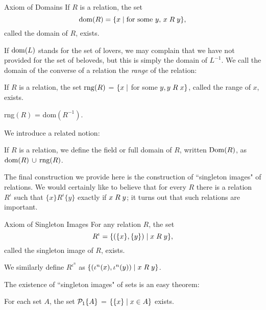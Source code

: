 \begin{axiom}{Axiom of Domains}
 If $R$ is a relation, the set
 $$
  \mathop{\mathrm{dom}}(R) = \{x \mid \mbox{for some $y$, $x \mathrel{R} y$}\},
 $$
 called the {\upshape domain} of $R$, exists.
\end{axiom}

If $\mathop{\mathrm{dom}}(L)$ stands for the set of lovers, we may complain that
we have not provided for the set of beloveds, but this is simply the
domain of $L^{-1}$.  We call the domain of the converse of a relation the {\itshape range} of the relation:

\begin{thm}
 If $R$ is a relation, the set $\mathop{\mathrm{rng}}(R)$ = 
 $\{x \mid$ for some $y, y \mathrel{R} x\}$, called the {\upshape range} of $x$,
 exists.
\end{thm}

\preuve  rng$(R)$ = dom$(R^{-1})$.
\finpreuve

We introduce a related notion:

\begin{definition}
 If $R$ is a relation, we define the {\upshape field}
 or {\upshape full domain} of $R$, written
 $\mathop{\mathrm{Dom}}(R)$, as $\mathop{\mathrm{dom}}(R)\,\cup\, \mathop{\mathrm{rng}}(R)$.
\end{definition}

The final construction we provide here is the construction of
``singleton images" of relations.  We would certainly like to believe
that for every $R$ there is a relation $R^{\iota}$ such that $\{x\}
\mathrel{R^{\iota}} \{y\}$ exactly if $x \mathrel{R} y$; it turns out that
such relations are important.

\begin{axiom}{Axiom of Singleton Images}
 For any relation $R$, the set 
 $$
  R^{\iota} =
  \{(\{x\},\{y\}) \mid x \mathrel{R} y\},
 $$
 called the {\upshape singleton image\/} of $R$, exists.
\end{axiom}

\begin{definition}
We similarly define $R^{\iota^n}$ as   $\{(\iota^n(x),\iota^n(y)) \mid x \mathrel{R} y\}$.

\end{definition}

The existence of ``singleton images" of sets is
an easy theorem:

\begin{thm}
 For each set $A$, the set ${\cal P}_1\{A\}$ = $\{\{x\} \mid x \in A\}$ exists.
\end{thm}

